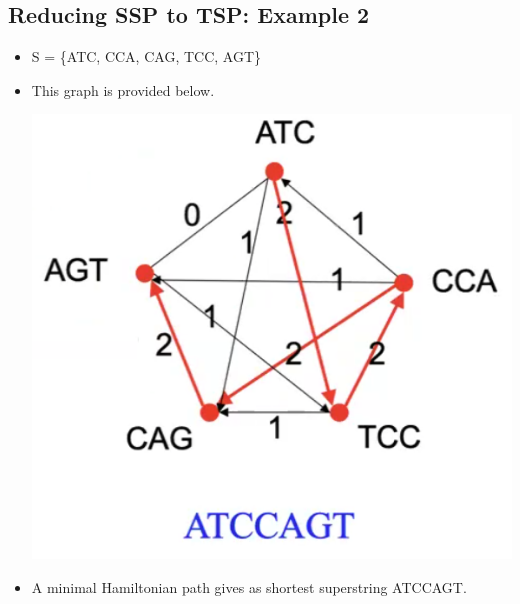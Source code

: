\documentclass[10pt]{article}
\begin{document}
\subsection*{Reducing SSP to TSP: Example 2}
\begin{itemize}
    \item S = \{ATC, CCA, CAG, TCC, AGT\}
    \item This graph is provided below.
    \begin{center}
        \includegraphics[scale=0.8]{W4_7.png}
    \end{center}
    \item A minimal Hamiltonian path gives as shortest superstring ATCCAGT.
\end{itemize}
\end{document}

